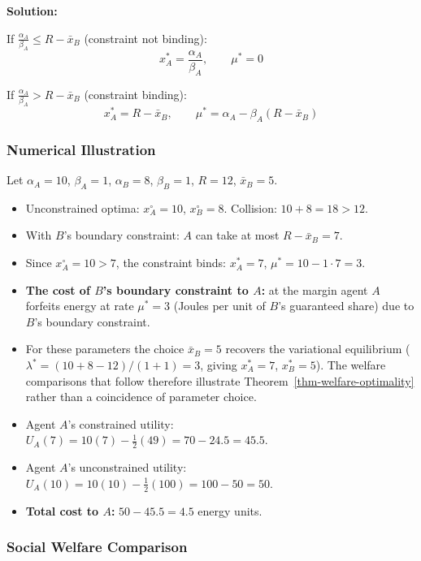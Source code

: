 \documentclass[11pt]{article}
\theoremstyle{plain}
\theoremstyle{definition}
\theoremstyle{remark}
\let\origsubsubsection\subsubsection
\renewcommand{\subsubsection}{\needspace{4\baselineskip}\origsubsubsection}
\providecommand{\tightlist}{%
  \setlength{\itemsep}{0pt}\setlength{\parskip}{0pt}}
\begin{document}
\textbf{Solution:}

If \(\frac{\alpha_A}{\beta_A} \leq R - \bar{x}_B\) (constraint not
binding): \[x_A^* = \frac{\alpha_A}{\beta_A}, \qquad \mu^* = 0\]

If \(\frac{\alpha_A}{\beta_A} > R - \bar{x}_B\) (constraint binding):
\[x_A^* = R - \bar{x}_B, \qquad \mu^* = \alpha_A - \beta_A(R - \bar{x}_B)\]

\subsubsection{Numerical Illustration}\label{numerical-illustration}

Let \(\alpha_A = 10\), \(\beta_A = 1\), \(\alpha_B = 8\),
\(\beta_B = 1\), \(R = 12\), \(\bar{x}_B = 5\).

\begin{itemize}
\tightlist
\item
  Unconstrained optima: \(x_A^{\circ} = 10\), \(x_B^{\circ} = 8\).
  Collision: \(10 + 8 = 18 > 12\).
\item
  With \(B\)'s boundary constraint: \(A\) can take at most
  \(R - \bar{x}_B = 7\).
\item
  Since \(x_A^{\circ} = 10 > 7\), the constraint binds: \(x_A^* = 7\),
  \(\mu^* = 10 - 1 \cdot 7 = 3\).
\item
  \textbf{The cost of \(B\)'s boundary constraint to \(A\):} at the
  margin agent \(A\) forfeits energy at rate \(\mu^* = 3\) (Joules per
  unit of \(B\)'s guaranteed share) due to \(B\)'s boundary constraint.
\item
  For these parameters the choice \(\bar{x}_B = 5\) recovers the
  variational equilibrium (\(\lambda^* = (10+8-12)/(1+1) = 3\), giving
  \(x_A^* = 7\), \(x_B^* = 5\)). The welfare comparisons that follow
  therefore illustrate Theorem~\ref{thm-welfare-optimality} rather than
  a coincidence of parameter choice.
\item
  Agent \(A\)'s constrained utility:
  \(U_A(7) = 10(7) - \frac{1}{2}(49) = 70 - 24.5 = 45.5\).
\item
  Agent \(A\)'s unconstrained utility:
  \(U_A(10) = 10(10) - \frac{1}{2}(100) = 100 - 50 = 50\).
\item
  \textbf{Total cost to \(A\):} \(50 - 45.5 = 4.5\) energy units.
\end{itemize}

\subsubsection{Social Welfare
Comparison}\label{social-welfare-comparison}
\end{document}
